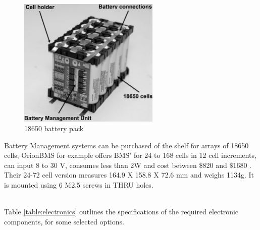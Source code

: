 \begin{figure}[H]
    \centering
    \includegraphics[width=0.6\textwidth]{Sections/LiteratureReview/img/electronics/std_18650_pack.png}
    \caption{18650 battery pack \cite{cults3d_17_nodate}}
    \label{fig:18650_pack}
\end{figure}

Battery Management systems can be purchased of the shelf for arrays of 18650 cells; OrionBMS for example offers BMS' for 24 to 168 cells in 12 cell increments, can input 8 to 30 V, consumes less than 2W and cost between \$820 and \$1680 \cite{orion_bms_orion_nodate}.
Their 24-72 cell version measures 164.9 X 158.8 X 72.6 mm and weighs 1134g.
It is mounted using 6 M2.5 screws in THRU holes.

\mbox{}\\

Table \ref{table:electronics} outlines the specifications of the required electronic components, for some selected options.

